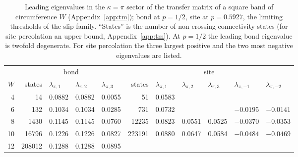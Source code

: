 \documentclass[pre,twocolumn,superscriptaddress,longbibliography,floatfix]{revtex4-2}
\begin{document}
\begin{table}
\caption{Leading eigenvalues in the $\kappa=\pi$ sector of the transfer matrix of a square band of circumference $W$ (Appendix~\ref{app:tm}); bond at $p=1/2$, site at $p=0.5927$, the limiting thresholds of the slip family. ``States'' is the number of non-crossing connectivity states (for site percolation an upper bound, Appendix~\ref{app:tm}). At $p=1/2$ the leading bond eigenvalue is twofold degenerate. For site percolation the three largest positive and the two most negative eigenvalues are listed.}
\label{tab:tm}
\begin{ruledtabular}
\begin{tabular}{rrlllrlllll}
 & \multicolumn{4}{c}{bond} & \multicolumn{6}{c}{site}\\
$W$ & states & $\lambda_{\pi,1}$ & $\lambda_{\pi,2}$ & $\lambda_{\pi,3}$ & states & $\lambda_{\pi,1}$ & $\lambda_{\pi,2}$ & $\lambda_{\pi,3}$ & $\lambda_{\pi,-1}$ & $\lambda_{\pi,-2}$\\
\hline
4 & 14 & 0.0882 & 0.0882 & 0.0055 & 51 & 0.0583 & & & & \\
6 & 132 & 0.1034 & 0.1034 & 0.0285 & 731 & 0.0732 & & & $-0.0195$ & $-0.0141$\\
8 & 1430 & 0.1145 & 0.1145 & 0.0760 & 12235 & 0.0823 & 0.0551 & 0.0525 & $-0.0370$ & $-0.0353$\\
10 & 16796 & 0.1226 & 0.1226 & 0.0827 & 223191 & 0.0880 & 0.0647 & 0.0584 & $-0.0484$ & $-0.0469$\\
12 & 208012 & 0.1288 & 0.1288 & 0.0895 & & & & & & \\
\end{tabular}
\end{ruledtabular}
\end{table}
\end{document}
